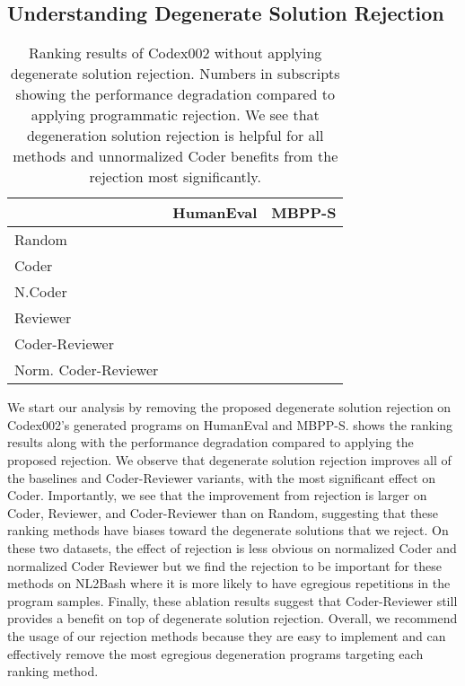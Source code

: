 \documentclass[nohyperref]{article}
\theoremstyle{plain}
\theoremstyle{definition}
\theoremstyle{remark}
\begin{document}
\subsection{Understanding Degenerate Solution Rejection}
\label{sec:rejection-ablation}
\begin{table}[]
\footnotesize
\centering
\begin{tabular}{lll}
\toprule
{} &               HumanEval &                  MBPP-S \\
\midrule
Random               &            &            \\
Coder                &            &            \\
N.Coder              &            &            \\
Reviewer             &            &            \\
Coder-Reviewer       &            &            \\
Norm. Coder-Reviewer &   &   \\
\bottomrule
\end{tabular}
 \caption{Ranking results of Codex002 without applying degenerate solution rejection. Numbers in subscripts showing the performance degradation compared to applying programmatic rejection.
We see that degeneration solution rejection is helpful for all methods and unnormalized Coder benefits from the rejection most significantly.
}
\vspace{-15pt}
\label{tab:ablation_table}
\end{table}

We start our analysis by removing the proposed degenerate solution rejection on Codex002's generated programs on HumanEval and MBPP-S.
 shows the ranking results along with the performance degradation compared to applying the proposed rejection.
We observe that degenerate solution rejection improves all of the baselines and Coder-Reviewer variants, with the most significant effect on Coder.
Importantly, we see that the improvement from rejection is larger on Coder, Reviewer, and Coder-Reviewer than on Random, suggesting that these ranking methods have biases toward the degenerate solutions that we reject.
On these two datasets, the effect of rejection is less obvious on normalized Coder and normalized Coder Reviewer but we find the rejection to be important for these methods on NL2Bash where it is more likely to have egregious repetitions in the program samples.
Finally, these ablation results suggest that Coder-Reviewer still provides a benefit on top of degenerate solution rejection.
Overall, we recommend the usage of our rejection methods because they are easy to implement and can effectively remove the most egregious degeneration programs targeting each ranking method.
\end{document}
